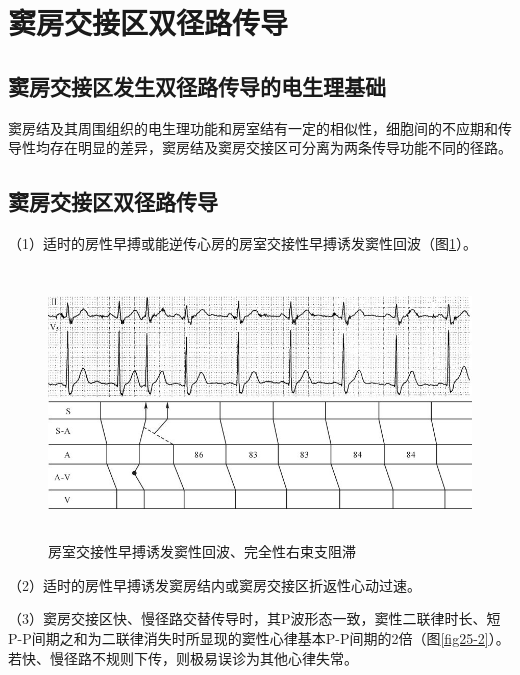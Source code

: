 \protect\hypertarget{text00032.htmlux5cux23subid377}{}{}

\section{窦房交接区双径路传导}

\protect\hypertarget{text00032.htmlux5cux23subid378}{}{}

\subsection{窦房交接区发生双径路传导的电生理基础}

窦房结及其周围组织的电生理功能和房室结有一定的相似性，细胞间的不应期和传导性均存在明显的差异，窦房结及窦房交接区可分离为两条传导功能不同的径路。

\protect\hypertarget{text00032.htmlux5cux23subid379}{}{}

\subsection{窦房交接区双径路传导}

（1）适时的房性早搏或能逆传心房的房室交接性早搏诱发窦性回波（图\ref{fig25-1}）。

\begin{figure}[!htbp]
 \centering
 \includegraphics[width=5.61458in,height=2.8125in]{./images/Image00412.jpg}
 \captionsetup{justification=centering}
 \caption{房室交接性早搏诱发窦性回波、完全性右束支阻滞}
 \label{fig25-1}
  \end{figure} 

（2）适时的房性早搏诱发窦房结内或窦房交接区折返性心动过速。

（3）窦房交接区快、慢径路交替传导时，其P波形态一致，窦性二联律时长、短P-P间期之和为二联律消失时所显现的窦性心律基本P-P间期的2倍（图\ref{fig25-2}）。若快、慢径路不规则下传，则极易误诊为其他心律失常。

